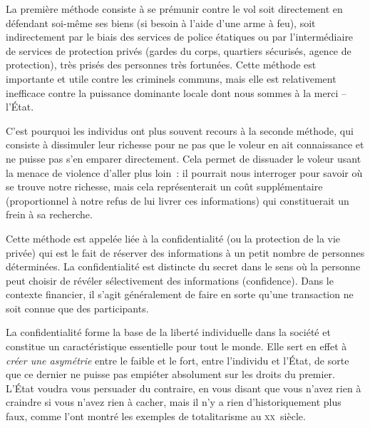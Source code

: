 La première méthode consiste à se prémunir contre le vol soit directement en défendant soi-même ses biens (si besoin à l'aide d'une arme à feu), soit indirectement par le biais des services de police étatiques ou par l'intermédiaire de services de protection privés (gardes du corps, quartiers sécurisés, agence de protection), très prisés des personnes très fortunées. Cette méthode est importante et utile contre les criminels communs, mais elle est relativement inefficace contre la puissance dominante locale dont nous sommes à la merci -- l'État.

C'est pourquoi les individus ont plus souvent recours à la seconde méthode, qui consiste à dissimuler leur richesse pour ne pas que le voleur en ait connaissance et ne puisse pas s'en emparer directement. Cela permet de dissuader le voleur usant la menace de violence d'aller plus loin~: il pourrait nous interroger pour savoir où se trouve notre richesse, mais cela représenterait un coût supplémentaire (proportionnel à notre refus de lui livrer ces informations) qui constituerait un frein à sa recherche.

Cette méthode est appelée liée à la confidentialité (ou la protection de la vie privée) qui est le fait de réserver des informations à un petit nombre de personnes déterminées. La confidentialité est distincte du secret dans le sens où la personne peut choisir de révéler sélectivement des informations (confidence). Dans le contexte financier, il s'agit généralement de faire en sorte qu'une transaction ne soit connue que des participants.

La confidentialité forme la base de la liberté individuelle dans la société et constitue un caractéristique essentielle pour tout le monde. Elle sert en effet à \emph{créer une asymétrie} entre le faible et le fort, entre l'individu et l'État, de sorte que ce dernier ne puisse pas empiéter absolument sur les droits du premier. L'État voudra vous persuader du contraire, en vous disant que vous n'avez rien à craindre si vous n'avez rien à cacher, mais il n'y a rien d'historiquement plus faux, comme l'ont montré les exemples de totalitarisme au \textsc{xx}\ieme{}~siècle.

